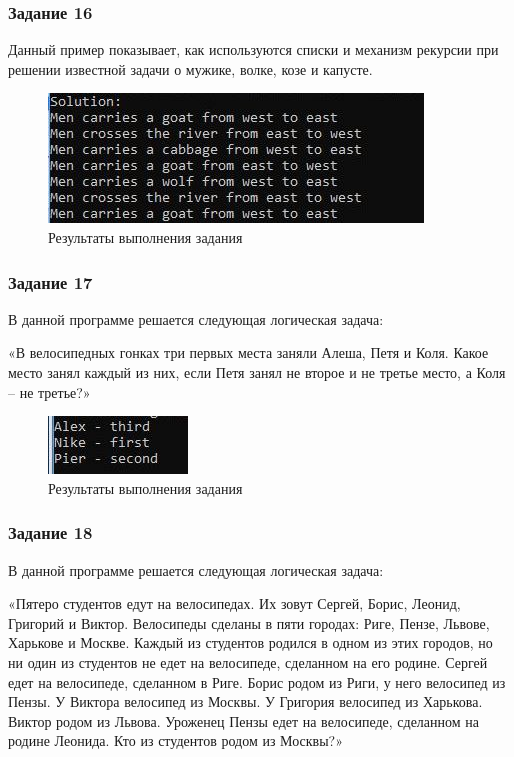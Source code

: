 \documentclass[14pt,a4paper,report]{report}
\begin{document}
\subsubsection{Задание 16}

Данный пример показывает, как используются списки и механизм рекурсии при решении известной задачи о мужике, волке, козе и капусте.



\begin{figure}[h!]
	\centering
	\includegraphics[scale = 1.0]{images/d16.jpeg}
	\caption{Результаты выполнения задания}
\end{figure}

\subsubsection{Задание 17}

В данной программе решается следующая логическая задача:

«В велосипедных гонках три первых места заняли Алеша, Петя и Коля. Какое место занял каждый из них, если Петя занял не второе и не третье место, а Коля – не третье?»



\begin{figure}[h!]
	\centering
	\includegraphics[scale = 1.0]{images/d17.jpeg}
	\caption{Результаты выполнения задания}
\end{figure}

\subsubsection{Задание 18}

В данной программе решается следующая логическая задача:

«Пятеро студентов едут на велосипедах. Их зовут Сергей, Борис, Леонид, Григорий и Виктор. Велосипеды сделаны в пяти городах: Риге, Пензе, Львове, Харькове и Москве. Каждый из студентов родился в одном из этих городов, но ни один из студентов не едет на велосипеде, сделанном на его родине. Сергей едет на велосипеде, сделанном в Риге. Борис родом из Риги, у него велосипед из Пензы. У Виктора велосипед из Москвы. У Григория велосипед из Харькова. Виктор родом из Львова. Уроженец Пензы едет на велосипеде, сделанном на родине Леонида. Кто из студентов родом из Москвы?»
\end{document}
